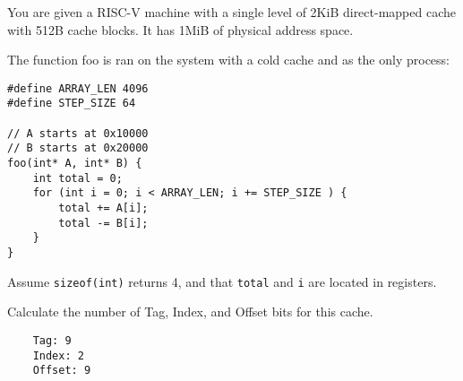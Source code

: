 \begin{blocksection}
\question
You are given a RISC-V machine with a single level of 2KiB direct-mapped cache with 512B cache blocks. It has 1MiB of physical address space.

The function foo is ran on the system with a cold cache and as the only process:

\begin{verbatim}
#define ARRAY_LEN 4096
#define STEP_SIZE 64

// A starts at 0x10000
// B starts at 0x20000
foo(int* A, int* B)	{
    int	total = 0;
    for	(int i = 0; i < ARRAY_LEN; i += STEP_SIZE ) {
        total += A[i];
        total -= B[i];
    }
}

\end{verbatim}
Assume \lstinline$sizeof(int)$ returns 4, and that \lstinline$total$ and \lstinline$i$ are located in registers.

Calculate the number of Tag, Index, and Offset bits for this cache.
\begin{solution}[0.7in]
    \begin{verbatim}
    Tag: 9
    Index: 2
    Offset: 9
    \end{verbatim}
\end{solution}

\end{blocksection}